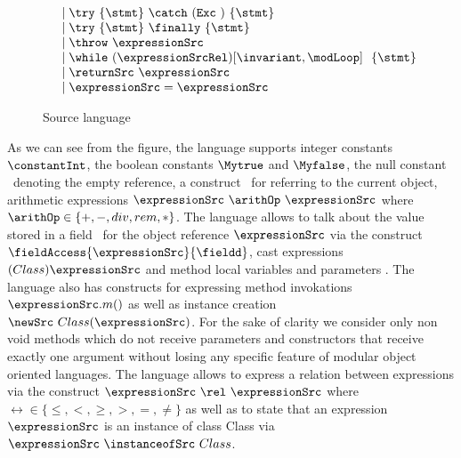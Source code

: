 \begin{figure}[ht!]
\begin{frameit}
$$\begin{array} {ll}
			        & \mid \try  \ \{ \stmt \}  \ \catch \ ( \mbox{\rm\texttt{Exc} } )\ \{ \stmt \} \\
		                & \mid \try  \ \{ \stmt \} \ \finally \ \{ \stmt \} \\
				& \mid \throw \ \expressionSrc  \\
                                & \mid \while \ (\expressionSrcRel) \lbrack \invariant, \modLoop \rbrack \ \do \ \{ \stmt \}\ \\
				& \mid \returnSrc \  \expressionSrc \\
                   		& \mid \expressionSrc = \expressionSrc \\        
    \end{array} $$
\caption{\sc Source language}
\label{source:grammar}
\end{frameit}
\end{figure}


    As we can see from the figure, the language supports 
    integer constants $\constantInt$, the boolean constants  $ \Mytrue$ and $\Myfalse$, the null constant \Mynull \ 
    denoting  the empty reference, a construct \this \ for referring to the current object,  
    arithmetic expressions  $\expressionSrc \ \arithOp \ \expressionSrc$ where $\arithOp \in  \{+ , - , div , rem, * \}$.
    The language  allows to talk about the value stored in a field \fieldd \ for the object reference $\expressionSrc $
    via the construct  $ \fieldAccess{\expressionSrc}{\fieldd} $, cast expressions  $(Class) \expressionSrc$
    and method local variables  and parameters \var.  
    The language also has constructs for expressing method invokations  $ \expressionSrc.m()  $  as well as instance creation
    $\newSrc \ Class(\expressionSrc )$. For the sake of clarity we consider only non void  methods which do not receive parameters and constructors
    that receive exactly one argument without losing
    any specific feature   of modular object oriented  languages. 
    The language allows to express a relation between  expressions via the construct
     $\expressionSrc \ \rel \ \expressionSrc $ where $\rel  \in \{ \le, < ,  \ge, >, = , \neq \}$ as well as to state that an expression 
   $\expressionSrc$ is an instance of class Class via  $\expressionSrc \ \instanceofSrc \ Class$.
    
